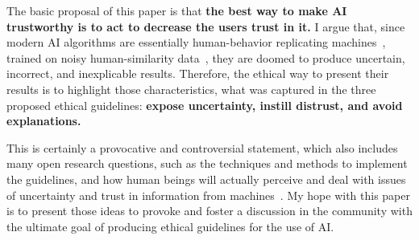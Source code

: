 \documentclass{article}
\begin{document}
The basic proposal of this paper is that \textbf{the best way to make AI trustworthy is to act to decrease the users trust in it.} I argue that, since modern AI algorithms are essentially human-behavior replicating machines~\cite{blackwell2019objective}, trained on noisy human-similarity data~\cite{kelleher2009conversational,crawford2021atlas}, they are doomed to produce uncertain, incorrect, and inexplicable results. Therefore, the ethical way to present their results is to highlight those characteristics, what was captured in the three proposed ethical guidelines: \textbf{expose uncertainty, instill distrust, and avoid explanations.}

This is certainly a provocative and controversial statement, which also includes many open research questions, such as the techniques and methods to implement the guidelines, and how human beings will actually perceive and deal with issues of uncertainty and trust in information from machines~\cite{dietvorst2015algorithm}. My hope with this paper is to present those ideas to provoke and foster a discussion in the community with the ultimate goal of producing ethical guidelines for the use of AI.
\end{document}
